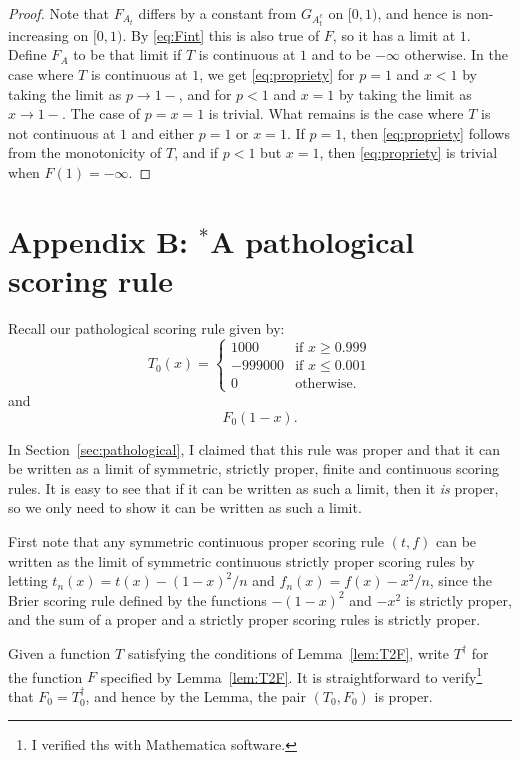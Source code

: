 \begin{proof}
Note that $F_{A_t}$ differs by a constant from $G_{A_t^c}$ on $[0,1)$, and hence is non-increasing on $[0,1)$.
By \eqref{eq:Fint} this is also true of $F$, so it has a limit at $1$. Define $F_A$ to be that limit if
$T$ is continuous at $1$ and to be $-\infty$ otherwise. In the case where $T$ is continuous at $1$, we get
\eqref{eq:propriety} for $p=1$ and $x<1$ by taking the limit as $p\to 1-$, and for $p<1$ and $x=1$ by
taking the limit as $x\to 1-$. The case of $p=x=1$ is trivial. What remains is the case where $T$ is
not continuous at $1$ and either $p=1$ or $x=1$. If $p=1$, then \eqref{eq:propriety} follows
from the monotonicity of $T$, and if $p<1$ but $x=1$, then \eqref{eq:propriety} is trivial when
$F(1)=-\infty$.
\end{proof}

\section*{Appendix B: $^*$A pathological scoring rule}
Recall our pathological scoring rule given by:
$$
	T_0(x) = \begin{cases} 1000 &\text{if }x\ge 0.999\\
						-999000 &\text{if }x\le 0.001\\
						0 &\text{otherwise}.
						\end{cases}
$$
and
$$
	F_0(1-x).
$$

In Section~\ref{sec:pathological}, I claimed that this rule was proper and that it can be written as a limit of
symmetric, strictly proper, finite and continuous scoring rules. It is easy to see that if it
can be written as such a limit, then it \textit{is} proper, so we only need to show it can be
written as such a limit.

First note that any symmetric continuous proper scoring rule $(t,f)$ can be written as the limit of symmetric continuous
strictly proper scoring rules by letting $t_n(x)=t(x)-(1-x)^2/n$ and $f_n(x)=f(x)-x^2/n$, since the Brier scoring rule defined
by the functions $-(1-x)^2$ and $-x^2$ is strictly proper, and the sum of a proper and a strictly proper scoring rules is
strictly proper. 

Given a function $T$ satisfying the conditions of Lemma~\ref{lem:T2F}, write $T^\dag$ for the function $F$
specified by Lemma~\ref{lem:T2F}. It is straightforward to verify\footnote{I verified ths with Mathematica software.} that $F_0=T_0^\dag$, and hence by the Lemma, the pair $(T_0,F_0)$ is proper.

